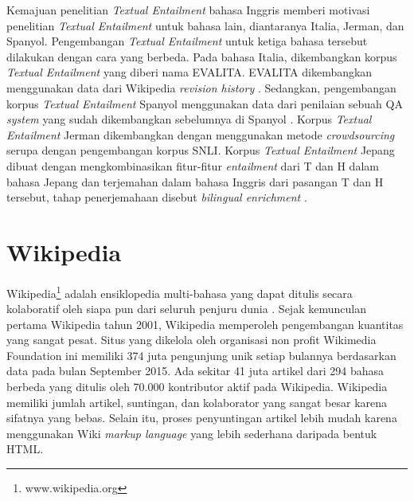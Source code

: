 	Kemajuan penelitian \textit{Textual Entailment} bahasa Inggris memberi motivasi penelitian \textit{Textual Entailment} untuk bahasa lain, diantaranya Italia, Jerman, dan Spanyol. Pengembangan \textit{Textual Entailment} untuk ketiga bahasa tersebut dilakukan dengan cara yang berbeda. Pada bahasa Italia, dikembangkan korpus \textit{Textual Entailment} yang diberi nama EVALITA. EVALITA dikembangkan menggunakan data dari Wikipedia \textit{revision history} \citep{RTEevalita}. Sedangkan, pengembangan korpus \textit{Textual Entailment} Spanyol menggunakan data dari penilaian sebuah QA \textit{system} yang sudah dikembangkan sebelumnya di Spanyol \citep{RTEsparte}. Korpus \textit{Textual Entailment} Jerman dikembangkan dengan menggunakan metode \textit{crowdsourcing} \citep{RTEjerman} serupa dengan pengembangan korpus SNLI. Korpus \textit{Textual Entailment} Jepang dibuat dengan mengkombinasikan fitur-fitur \textit{entailment} dari T dan H dalam bahasa Jepang dan terjemahan dalam bahasa Inggris dari pasangan T dan H tersebut, tahap penerjemahaan disebut \textit{bilingual enrichment} \citep{pham2012empirical}. 
	

\section{Wikipedia}
Wikipedia\footnote{www.wikipedia.org} adalah ensiklopedia multi-bahasa yang dapat ditulis secara kolaboratif oleh siapa pun dari seluruh penjuru dunia \citep{wikipediaxml:2005}. Sejak kemunculan pertama Wikipedia tahun 2001, Wikipedia memperoleh pengembangan kuantitas yang sangat pesat. Situs yang dikelola oleh organisasi non profit Wikimedia Foundation ini memiliki 374 juta pengunjung unik setiap bulannya berdasarkan data pada bulan September 2015. Ada sekitar 41 juta artikel dari 294 bahasa berbeda yang ditulis oleh 70.000 kontributor aktif pada Wikipedia. Wikipedia memiliki jumlah artikel, suntingan, dan kolaborator yang sangat besar karena sifatnya yang bebas. Selain itu, proses penyuntingan artikel lebih mudah karena menggunakan Wiki \textit{markup language} yang lebih sederhana daripada bentuk HTML. 


